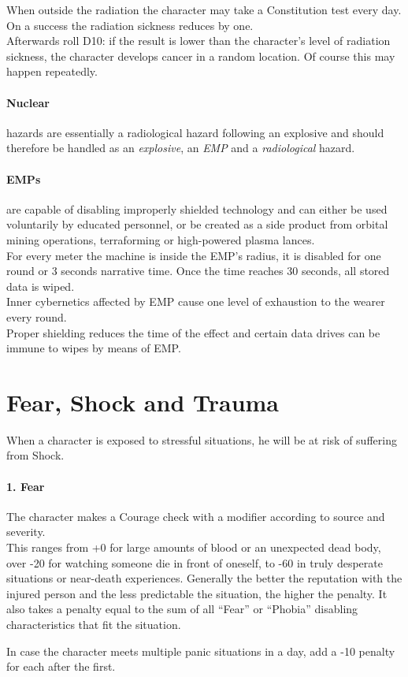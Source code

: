 \documentclass[12pt,a4paper,openany,usenames,dvipsnames]{book}
\begin{document}
	\par
	When outside the radiation the character may take a Constitution test every day. On a success the radiation sickness reduces by one.\\
	Afterwards roll D10: if the result is lower than the character's level of radiation sickness, the character develops cancer in a random location.
	Of course this may happen repeatedly.
	\paragraph{Nuclear} hazards are essentially a radiological hazard following an explosive and should therefore be handled as an \emph{explosive}, an \emph{EMP} and a \emph{radiological} hazard.
	\paragraph{EMPs} are capable of disabling improperly shielded technology and can either be used voluntarily by educated personnel, or be created as a side product from orbital mining operations, terraforming or high-powered plasma lances.\\
	For every meter the machine is inside the EMP’s radius, it is disabled for one round or 3 seconds narrative time. Once the time reaches 30 seconds, all stored data is wiped.\\
	Inner cybernetics affected by EMP cause one level of exhaustion to the wearer every round.\\
	Proper shielding reduces the time of the effect and certain data drives can be immune to wipes by means of EMP.
%
	\section{Fear, Shock and Trauma}
	When a character is exposed to stressful situations, he will be at risk of suffering from Shock.
	\\%
	\paragraph{1. Fear}
	The character makes a Courage check with a modifier according to source and severity.\\
	This ranges from +0 for large amounts of blood or an unexpected dead body, over -20 for watching someone die in front of oneself, to -60 in truly desperate situations or near-death experiences.
	Generally the better the reputation with the injured person and the less predictable the situation, the higher the penalty. It also takes a penalty equal to the sum of all “Fear” or “Phobia” disabling characteristics that fit the situation.
	\par \vspace{-5mm}
	In case the character meets multiple panic situations in a day, add a -10 penalty for each after the first.
\end{document}
